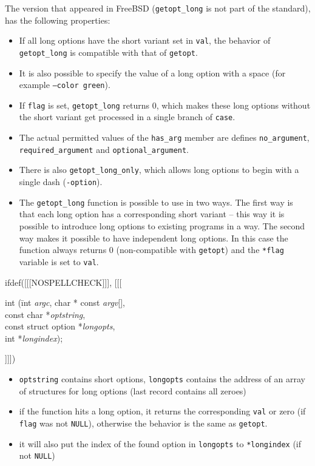 The version that appeared in FreeBSD (\texttt{getopt\_long} is not part
of the standard), has the following properties:

\begin{itemize}
\item If all long options have the short variant set in \texttt{val}, the
behavior of \texttt{getopt\_long} is compatible with that of \texttt{getopt}.
\item It is also possible to specify the value of a long option with a space
(for example \texttt{--color~green}).
\item If \texttt{flag} is set, \texttt{getopt\_long} returns 0, which makes
these long options without the short variant get processed in a single branch of
\texttt{case}.
\item The actual permitted values of the \texttt{has\_arg} member are defines
\texttt{no\_argument}, \texttt{required\_argument} and \texttt{optional\_argument}.
\item There is also \texttt{getopt\_long\_only}, which allows long options
to begin with a single dash (\texttt{-option}).
\item The \texttt{getopt\_long} function is possible to use in two ways.
The first way is that each long option has a corresponding short variant
-- this way it is possible to introduce long options to existing programs
in a  way. The second way makes it possible to have
independent long options. In this case the function always returns 0
(non-compatible with \texttt{getopt}) and the \texttt{*flag} variable
is set to \texttt{val}.
\end{itemize}


\begin{slide}
ifdef([[[NOSPELLCHECK]]], [[[
{\tt\begin{tabbing}
int (\=int \emph{argc}, char * const \emph{argv}[],\\
\>const char *\emph{optstring},\\
\>const struct option *\emph{longopts},\\
\>int *\emph{longindex});
\end{tabbing}}
]]])
\begin{itemize}
\item \texttt{optstring} contains short options,
\texttt{longopts} contains the address of an array of structures for long options
(last record contains all zeroes)
\item if the function hits a long option, it returns the corresponding
\texttt{val} or zero (if \texttt{flag} was not \texttt{NULL}),
otherwise the behavior is the same as \texttt{getopt}.
\item it will also put the index of the found option in \texttt{longopts}
to \texttt{*longindex} (if not \texttt{NULL})
\end{itemize}
\end{slide}

